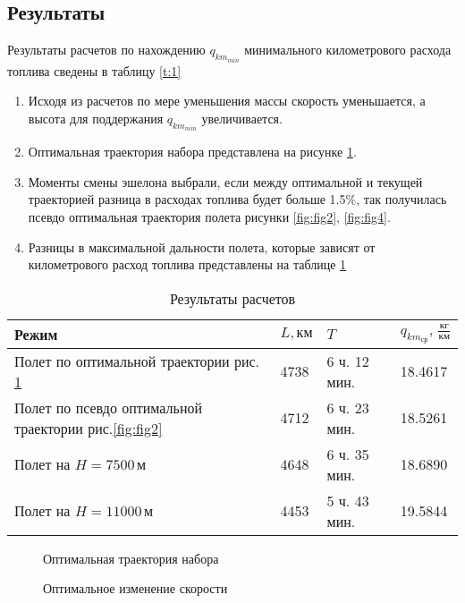 \documentclass[bachelor,subf,14pt, substylefile = spbu.rtx]{disser}
\begin{document}
\subsection{Результаты}
Результаты расчетов по нахождению $q_{{km}_{min}}$ минимального километрового расхода топлива сведены в таблицу \ref{t:1}
\begin{enumerate}
\item Исходя из расчетов по мере уменьшения массы скорость уменьшается, а высота для поддержания $q_{{km}_{min}}$ увеличивается.
\item Оптимальная траектория набора представлена на рисунке \ref{fig:fig1}.
\item Моменты смены эшелона выбрали, если между оптимальной и текущей траекторией разница в расходах топлива будет больше 1.5\%, так получилась псевдо оптимальная траектория полета рисунки \ref{fig:fig2}, \ref{fig:fig4}.
\item Разницы в максимальной дальности полета, которые зависят от километрового расход топлива представлены на таблице \ref{tab:tab:opt_vs_const_h} 
\end{enumerate}

\begin{table}[H]
\centering
\begin{tabular}{|l|l|l|l|}
\hline
Режим & $L, км$ & $T$ & $q_{km_{ср}}, \, \frac{кг}{км}$\\
\hline
Полет по оптимальной траектории рис. \ref{fig:fig1}& 4738 & 6 ч. 12 мин. & 18.4617\\
\hline
Полет по псевдо оптимальной траектории рис.\ref{fig:fig2}& 4712 & 6 ч. 23 мин. & 18.5261\\
\hline
Полет на $H=7500\,м$ & 4648 & 6 ч. 35 мин.& 18.6890\\
\hline
Полет на $H=11000\,м$ & 4453 & 5 ч. 43 мин. & 19.5844\\
\hline
\end{tabular}
\caption{Результаты расчетов}
\label{tab:tab:opt_vs_const_h}
\end{table}


\begin{figure}[H]
\centering
\scalebox{0.8}{}
\caption{Оптимальная траектория набора}
\label{fig:fig1}
\end{figure}
\begin{figure}[H]
\centering
\scalebox{0.8}{}
\caption{Оптимальное изменение скорости}
\label{fig:fig3}
\end{figure}
\end{document}

